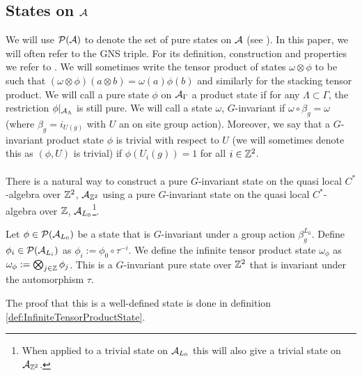 \documentclass[11pt,a4paper,twoside]{article}
\numberwithin{equation}{section}
\begin{document}
	\subsection{States on $\AA$}\label{sec:States}
	We will use $\PP(\AA)$ to denote the set of pure states on $\AA$ (see \cite{bratteli1979operator}). In this paper, we will often refer to the GNS triple. For its definition, construction and properties we refer to \cite{bratteli1979operator}. We will sometimes write the tensor product of states $\omega\otimes\phi$ to be such that $(\omega\otimes\phi)(a\otimes b)=\omega(a)\phi(b)$ and similarly for the stacking tensor product. We will call a pure state $\phi$ on $\AA_\Gamma$ a product state if for any $\Lambda\subset\Gamma$, the restriction $\phi|_{\AA_\Lambda}$ is still pure. We will call a state $\omega$, $G$-invariant if $\omega\circ\beta_g=\omega$ (where $\beta_g=i_{U(g)}$ with $U$ an on site group action). Moreover, we say that a $G$-invariant product state $\phi$ is trivial with respect to $U$ (we will sometimes denote this as $(\phi,U)$ is trivial) if $\phi(U_i(g))=1$ for all $i\in\ZZ^2$.\\\\
	There is a natural way to construct a pure $G$-invariant state on the quasi local $C^*$-algebra over $\ZZ^2$, $\AA_{\ZZ^2}$ using a pure $G$-invariant state on the quasi local $C^*$-algebra over $\ZZ$, $\AA_{L_0}$\footnote{When applied to a trivial state on $\AA_{L_0}$ this will also give a trivial state on $\AA_{\ZZ^2}$.}.
	\begin{definition}\label{def:InfiniteTensorProduct}
		Let $\phi\in\PP(\AA_{L_0})$ be a state that is $G$-invariant under a group action $\beta_g^{L_0}$. Define $\phi_i\in\PP(\AA_{L_i})$ as $\phi_i:=\phi_0\circ\tau^{-i}$. We define the infinite tensor product state $\omega_\phi$ as $\omega_\phi:=\bigotimes_{j\in\ZZ}\phi_j$. This is a $G$-invariant pure state over $\ZZ^2$ that is invariant under the automorphism $\tau$.
	\end{definition}
	The proof that this is a well-defined state is done in definition \ref{def:InfiniteTensorProductState}.
\end{document}

